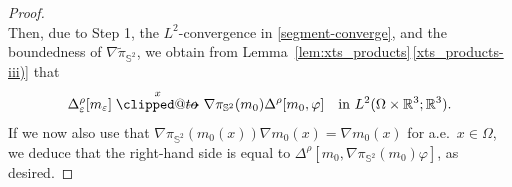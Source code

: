 \documentclass[reqno,11pt]{amsart}
\makeatletter
\numberwithin{equation}{section}
\theoremstyle{thmlemcorr}
\numberwithin{theorem}{section}
\theoremstyle{thmlemcorr*}
\theoremstyle{defi}
\theoremstyle{remexample}
\theoremstyle{ass}
\newcommand{\R}{\mathbb{R}}
\renewcommand{\S}{\mathbb{S}}
\renewcommand{\epsilon}{\varepsilon}
\newcommand{\1}{\mathds{1}}
\DeclareRobustCommand{\twoscale}{%
  \clippedto\mathrel{\mspace{-15mu}}\to
}
\newcommand{\clippedto}{%
  \mathrel{\mathpalette\clipped@to\relax}%
}
\newcommand{\clipped@to}[2]{%
  \sbox\z@{$\m@th#1\mspace{6mu}$}%
  \clipbox{0pt 0pt {\dimexpr\width-.5\wd\z@} 0pt}{$\m@th#1\to$}%
  \smash{\clipbox{{\wd\z@} 0pt 0pt {-\width}}{$\m@th#1\to$}}%
}
\newcommand{\xtwoscale}{\overset{x}{\twoscale}}
\newcommand{\Om}{\Omega}
\newcommand{\veps}{\varepsilon}
\makeatother
\begin{document}
\begin{proof}
\begin{equation*}
\end{equation*}
Then, due to Step 1, the $L^2$-convergence in \eqref{segment-converge}, and the boundedness of $\nabla \tilde{\pi}_{\S^2}$, we obtain from Lemma~\ref{lem:xts_products}\,\ref{xts_products-iii)} that
\begin{equation*}
   \Delta_\epsilon^\rho[m_\veps] \xtwoscale  \nabla \pi_{\S^2}(m_0)\Delta^\rho[m_0,\varphi] \quad\text{in $L^2(\Omega\times\R^3;\R^3)$}. 
\end{equation*}
If we now also use that $\nabla \pi_{\S^2}(m_0(x))  \nabla m_0(x) = \nabla m_0(x)$ for a.e.~$x \in \Omega$, we deduce that the right-hand side is equal to \(\Delta^\rho[m_0,\nabla \pi_{\S^2}(m_0)\varphi]\), as desired.

\end{proof}
\end{document}
